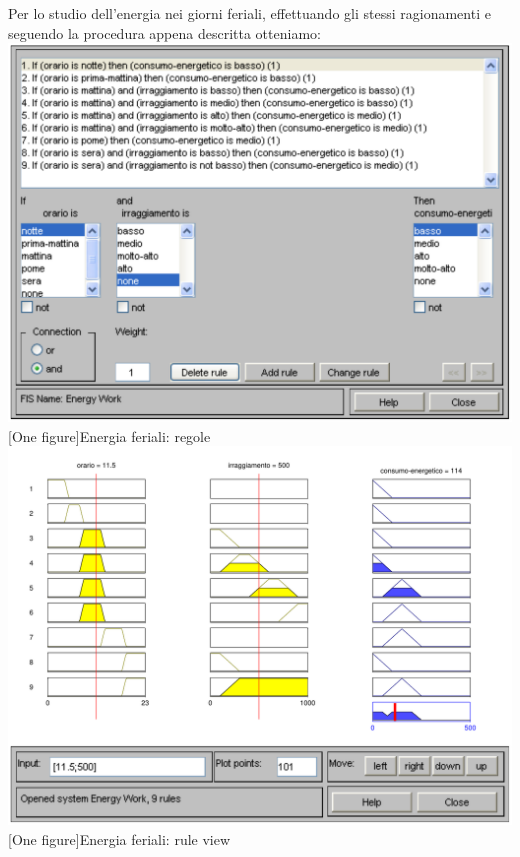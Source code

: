 Per lo studio dell'energia nei giorni feriali, effettuando gli stessi ragionamenti e seguendo la procedura appena descritta otteniamo:\\
\vspace{20px}
\includegraphics[scale=0.5]{images/fuzzy/energia_feriali_regole.pdf}
[One figure]{Energia feriali: regole}
\vspace{20px}
\includegraphics[scale=0.5]{images/fuzzy/energia_feriali_rule_view.pdf}
[One figure]{Energia feriali: rule view}
\vspace{20px}
